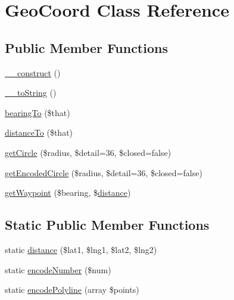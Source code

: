 \hypertarget{class_geo_coord}{}\section{Geo\+Coord Class Reference}
\label{class_geo_coord}
\subsection*{Public Member Functions}
\begin{DoxyCompactItemize}
\item 
\hyperlink{class_geo_coord_a095c5d389db211932136b53f25f39685}{\+\_\+\+\_\+construct} ()
\item 
\hyperlink{class_geo_coord_a7516ca30af0db3cdbf9a7739b48ce91d}{\+\_\+\+\_\+to\+String} ()
\item 
\hyperlink{class_geo_coord_a46c0721b63a16147f5d31612a92d45fe}{bearing\+To} (\$that)
\item 
\hyperlink{class_geo_coord_a4ad806fdffc9dfe7c5686b1c05131061}{distance\+To} (\$that)
\item 
\hyperlink{class_geo_coord_a7e245e4074943bd5dee8e67f9e6eb718}{get\+Circle} (\$radius, \$detail=36, \$closed=false)
\item 
\hyperlink{class_geo_coord_ab0713a08f83cd79bc725819e1853959a}{get\+Encoded\+Circle} (\$radius, \$detail=36, \$closed=false)
\item 
\hyperlink{class_geo_coord_ac9ada6d4e291e5e1f3e4f5d7026050ba}{get\+Waypoint} (\$bearing, \$\hyperlink{class_geo_coord_a0c40020f65f4200d0071dc80398fbbaa}{distance})
\end{DoxyCompactItemize}
\subsection*{Static Public Member Functions}
\begin{DoxyCompactItemize}
\item 
static \hyperlink{class_geo_coord_a0c40020f65f4200d0071dc80398fbbaa}{distance} (\$lat1, \$lng1, \$lat2, \$lng2)
\item 
static \hyperlink{class_geo_coord_ac43189d5dc1c5b44a7eeab5cad57fbbb}{encode\+Number} (\$num)
\item 
static \hyperlink{class_geo_coord_ada9afc39cada77fa016786250f380a10}{encode\+Polyline} (array \$points)
\end{DoxyCompactItemize}
